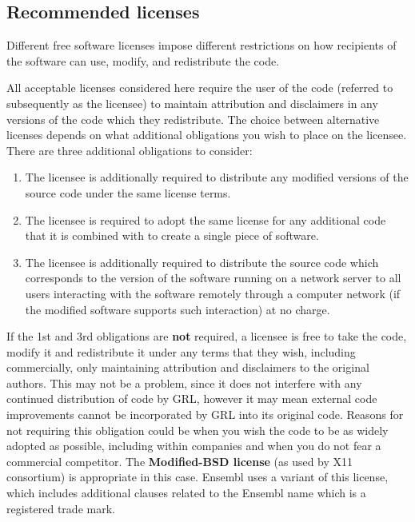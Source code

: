 \documentclass[10pt,a4paper]{article}
\begin{document}
\subsection{Recommended licenses}
\label{section:impnotes.recommended}

Different free software licenses impose different restrictions on how recipients 
of the software can use, modify, and redistribute the code. 

All acceptable licenses considered here require the user of the code (referred to 
subsequently as the licensee) to maintain attribution and disclaimers in any versions of 
the code which they redistribute. The choice between alternative licenses depends on 
what additional obligations you wish to place on the licensee. There are three additional obligations to consider: 

\begin{enumerate}
\item The licensee is additionally required to distribute any modified versions of the 
source code under the same license terms. 
\item The licensee is required to adopt the same license for any additional code that it 
is combined with to create a single piece of software. 
\item The licensee is additionally required to distribute the source code which 
corresponds to the version of the software running on a network server to all 
users interacting with the software remotely through a computer network (if the 
modified software supports such interaction) at no charge. 
\end{enumerate}

If the 1st and 3rd obligations are \textbf{not} required, a licensee is free to take the code, modify 
it and redistribute it under any terms that they wish, including commercially, only 
maintaining attribution and disclaimers to the original authors. This may not be a 
problem, since it does not interfere with any continued distribution of code by GRL, 
however it may mean external code improvements cannot be incorporated by GRL into 
its original code. Reasons for not requiring this obligation could be when you wish the 
code to be as widely adopted as possible, including within companies and when you do 
not fear a commercial competitor. The \textbf{Modified-BSD license} (as used by X11 
consortium) is appropriate in this case. Ensembl uses a variant of this license, which 
includes additional clauses related to the Ensembl name which is a registered trade 
mark. 
 
\end{document}
